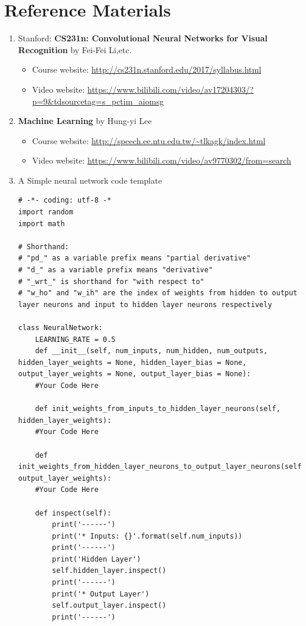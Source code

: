 \documentclass[a4paper, 11pt]{article}
\begin{document}
\section{Reference Materials}
\begin{enumerate}
	\item Stanford: \textbf{CS231n: Convolutional Neural Networks for Visual Recognition} by Fei-Fei Li,etc.
	\begin{itemize}
		\item Course website: \url{http://cs231n.stanford.edu/2017/syllabus.html}
		\item Video website: \url{https://www.bilibili.com/video/av17204303/?p=9&tdsourcetag=s_pctim_aiomsg}
	\end{itemize}
	
	\item \textbf{Machine Learning} by Hung-yi Lee
	\begin{itemize}
		\item Course website: \url{http://speech.ee.ntu.edu.tw/~tlkagk/index.html}
		\item Video website: \url{https://www.bilibili.com/video/av9770302/from=search}
	\end{itemize}
	\item A Simple neural network code template
	\begin{lstlisting}
# -*- coding: utf-8 -*
import random
import math

# Shorthand:
# "pd_" as a variable prefix means "partial derivative"
# "d_" as a variable prefix means "derivative"
# "_wrt_" is shorthand for "with respect to"
# "w_ho" and "w_ih" are the index of weights from hidden to output layer neurons and input to hidden layer neurons respectively

class NeuralNetwork:
    LEARNING_RATE = 0.5
    def __init__(self, num_inputs, num_hidden, num_outputs, hidden_layer_weights = None, hidden_layer_bias = None, output_layer_weights = None, output_layer_bias = None):
    #Your Code Here

    def init_weights_from_inputs_to_hidden_layer_neurons(self, hidden_layer_weights):
    #Your Code Here

    def init_weights_from_hidden_layer_neurons_to_output_layer_neurons(self, output_layer_weights):    
    #Your Code Here

    def inspect(self):
        print('------')
        print('* Inputs: {}'.format(self.num_inputs))
        print('------')
        print('Hidden Layer')
        self.hidden_layer.inspect()
        print('------')
        print('* Output Layer')
        self.output_layer.inspect()
        print('------')


\end{lstlisting}
\end{enumerate}
\end{document}
